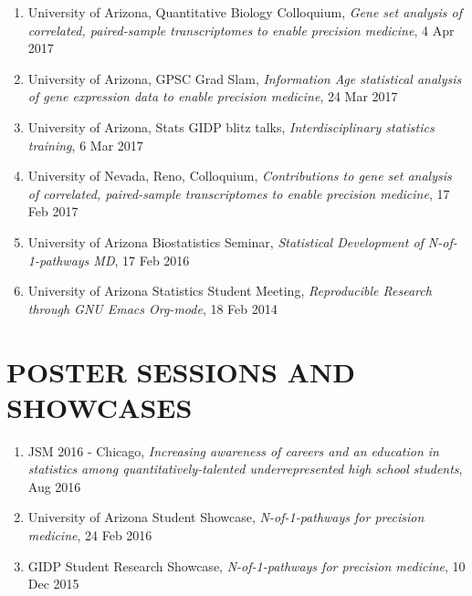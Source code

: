\documentclass[paper=a4,fontsize=11pt]{scrartcl} %
\newcommand{\NewPart}[2]{\section*{\uppercase{#1} #2 }}
\newcommand{\TalkEntry}[4]{
		\noindent #1, #2, #3 #4}
\begin{document}
\vspace{-7pt}
\begin{enumerate}
  
\item\TalkEntry{University of Arizona, Quantitative Biology Colloquium}{\textit{Gene set analysis of correlated, paired-sample transcriptomes to enable precision medicine}}{4 Apr 2017}{}  
  \item\TalkEntry{University of Arizona, GPSC Grad Slam}{\textit{Information Age statistical analysis of gene expression data to enable precision medicine}}{24 Mar 2017}{}
\item\TalkEntry{University of Arizona, Stats GIDP blitz talks}{\textit{Interdisciplinary statistics training}}{6 Mar 2017}{}

\item\TalkEntry{University of Nevada, Reno, Colloquium}{\textit{Contributions to gene set analysis of correlated, paired-sample transcriptomes to enable precision medicine}}{17 Feb 2017}{}

\item\TalkEntry{University of Arizona Biostatistics Seminar}{\textit{Statistical Development of N-of-1-pathways MD}}{17 Feb 2016}{}
\item\TalkEntry{University of Arizona Statistics Student Meeting}{\textit{Reproducible Research through GNU Emacs Org-mode}}{18 Feb 2014}{}
\vspace{-7pt}
\end{enumerate}

\NewPart{Poster sessions and Showcases}{}
\vspace{-7pt}
\begin{enumerate}
\item\TalkEntry{JSM 2016 - Chicago}{\textit{Increasing awareness of careers and an education in statistics among quantitatively-talented underrepresented high school students}}{Aug 2016}{}
\item\TalkEntry{University of Arizona Student Showcase}{\textit{N-of-1-pathways for precision medicine}}{24 Feb 2016}{}
\item\TalkEntry{GIDP Student Research Showcase}{\textit{N-of-1-pathways for precision medicine}}{10 Dec 2015}{}
\vspace{-7pt}
\end{enumerate}
\end{document}
